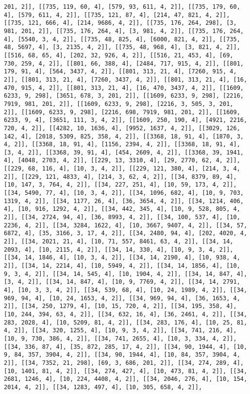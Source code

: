 \documentclass[12pt,fleqn]{article}\usepackage{../../common}
\begin{document}
\begin{verbatim}
201, 2]], [[735, 119, 60, 4], [579, 93, 611, 4, 2]], [[735, 179, 60, 4], [579, 611, 4, 2]], [[735, 121, 87, 4], [214, 47, 821, 4, 2]], [[735, 121, 666, 4], [214, 9686, 4, 2]], [[735, 176, 264, 298], [3, 981, 201, 2]], [[735, 176, 264, 4], [3, 981, 4, 2]], [[735, 176, 264, 4], [5540, 3, 4, 2]], [[735, 48, 825, 4], [6000, 821, 4, 2]], [[735, 48, 5697, 4], [3, 2135, 4, 2]], [[735, 48, 968, 4], [3, 821, 4, 2]], [[516, 68, 65, 4], [202, 32, 926, 4, 2]], [[516, 21, 453, 4], [69, 730, 259, 4, 2]], [[801, 66, 388, 4], [2484, 717, 915, 4, 2]], [[801, 179, 91, 4], [564, 3437, 4, 2]], [[801, 313, 21, 4], [7260, 915, 4, 2]], [[801, 313, 21, 4], [7260, 3437, 4, 2]], [[801, 313, 21, 4], [16, 470, 915, 4, 2]], [[801, 313, 21, 4], [16, 470, 3437, 4, 2]], [[1609, 6233, 9, 298], [3651, 678, 3, 201, 2]], [[1609, 6233, 9, 298], [2216, 7919, 981, 201, 2]], [[1609, 6233, 9, 298], [2216, 3, 505, 3, 201, 2]], [[1609, 6233, 9, 298], [2216, 698, 7919, 981, 201, 2]], [[1609, 6233, 9, 4], [3651, 111, 3, 4, 2]], [[1609, 250, 190, 4], [4921, 2216, 720, 4, 2]], [[4282, 10, 1636, 4], [9952, 1637, 4, 2]], [[3029, 126, 142, 4], [2018, 5309, 825, 358, 4, 2]], [[3368, 18, 91, 4], [1870, 3, 4, 2]], [[3368, 18, 91, 4], [1156, 2394, 4, 2]], [[3368, 18, 91, 4], [3, 4, 2]], [[3368, 39, 91, 4], [454, 2609, 4, 2]], [[3368, 39, 1941, 4], [4048, 2703, 4, 2]], [[229, 13, 3310, 4], [29, 2770, 62, 4, 2]], [[229, 68, 116, 4], [10, 3, 4, 2]], [[229, 121, 380, 4], [214, 3, 4, 2]], [[229, 121, 4833, 4], [214, 3, 62, 4, 2]], [[34, 8379, 89, 4], [10, 147, 3, 764, 4, 2]], [[34, 227, 251, 4], [10, 59, 173, 4, 2]], [[34, 5490, 77, 4], [10, 3, 4, 2]], [[34, 1096, 682, 4], [10, 9, 703, 1319, 4, 2]], [[34, 1177, 26, 4], [36, 3654, 4, 2]], [[34, 1214, 406, 4], [10, 916, 1292, 4, 2]], [[34, 442, 345, 4], [10, 9, 528, 805, 4, 2]], [[34, 2724, 94, 4], [36, 8993, 4, 2]], [[34, 100, 537, 4], [10, 2236, 4, 2]], [[34, 3284, 1622, 4], [10, 3667, 9407, 4, 2]], [[34, 57, 6872, 4], [35, 3166, 3, 17, 4, 2]], [[34, 2480, 94, 4], [202, 4020, 4, 2]], [[34, 2021, 21, 4], [10, 71, 557, 8461, 63, 4, 2]], [[34, 14, 2093, 4], [10, 2115, 4, 2]], [[34, 14, 330, 4], [10, 9, 3, 4, 2]], [[34, 14, 1846, 4], [10, 3, 4, 2]], [[34, 14, 2190, 4], [10, 938, 4, 2]], [[34, 14, 2214, 4], [10, 5949, 4, 2]], [[34, 14, 1856, 4], [10, 9, 3, 4, 2]], [[34, 14, 545, 4], [10, 1904, 4, 2]], [[34, 14, 847, 4], [3, 4, 2]], [[34, 14, 847, 4], [10, 9, 7769, 4, 2]], [[34, 14, 2791, 4], [10, 3, 3, 4, 2]], [[34, 539, 68, 4], [10, 24, 1989, 4, 2]], [[34, 969, 94, 4], [10, 24, 1653, 4, 2]], [[34, 969, 94, 4], [36, 1653, 4, 2]], [[34, 250, 1279, 4], [10, 15, 720, 4, 2]], [[34, 195, 358, 4], [10, 244, 394, 63, 4, 2]], [[34, 632, 16, 4], [36, 2461, 4, 2]], [[34, 283, 2028, 4], [10, 5209, 81, 4, 2]], [[34, 283, 176, 4], [10, 25, 81, 4, 2]], [[34, 320, 1255, 4], [10, 9, 3, 4, 2]], [[34, 741, 216, 4], [10, 9, 730, 386, 4, 2]], [[34, 741, 2655, 4], [10, 3, 334, 4, 2]], [[34, 336, 87, 4], [35, 872, 285, 17, 4, 2]], [[34, 90, 1944, 4], [10, 9, 84, 357, 3904, 4, 2]], [[34, 90, 1944, 4], [10, 84, 357, 3904, 4, 2]], [[34, 7352, 21, 298], [69, 3, 686, 201, 2]], [[34, 274, 289, 4], [10, 1401, 81, 4, 2]], [[34, 274, 427, 4], [10, 473, 81, 4, 2]], [[34, 2681, 1246, 4], [10, 224, 4408, 4, 2]], [[34, 2046, 276, 4], [10, 154, 2014, 4, 2]], [[34, 1283, 497, 4], [10, 305, 658, 4, 2]], 
\end{verbatim}
\end{document}
